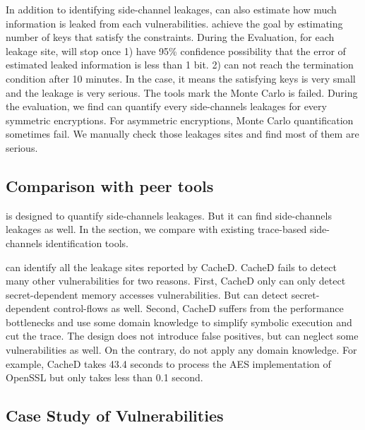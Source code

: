In addition to identifying side-channel leakages, \tool{} can also estimate how
much information is leaked from each vulnerabilities. \tool{} achieve 
the goal by estimating number of keys that satisfy the constraints.
During the Evaluation, for each leakage site, 
\tool{} will stop once 1) have 95\% confidence 
possibility that the error of estimated leaked information is less than
1 bit. 2) can not reach the termination condition after 10 minutes. In 
the case, it means the satisfying keys is very small and the leakage is 
very serious. The tools mark the Monte Carlo is failed. During the 
evaluation, we find \tool{} can quantify every side-channels leakages 
for every symmetric encryptions. For asymmetric encryptions, Monte 
Carlo quantification sometimes fail. We manually check those leakages
sites and find most of them are serious.

\subsection{Comparison with peer tools}
\tool{} is designed to quantify side-channels leakages. But it can
find side-channels leakages as well. In the section, we compare 
\tool{} with existing trace-based side-channels identification 
tools.

\tool{} can identify all the leakage sites reported by CacheD.
CacheD fails to detect many other vulnerabilities for two
reasons. First, CacheD only can only detect secret-dependent
memory accesses vulnerabilities. But \tool{} can detect 
secret-dependent control-flows as well. Second, CacheD suffers
from the performance bottlenecks and use some domain knowledge 
to simplify symbolic execution and cut the trace. The design does 
not introduce false positives, but can neglect some vulnerabilities 
as well. On the contrary, \tool{} do not apply any domain knowledge.
For example, CacheD takes 43.4 seconds to process the AES implementation
of OpenSSL but \tool{} only takes less than 0.1 second.


\subsection{Case Study of Vulnerabilities}
